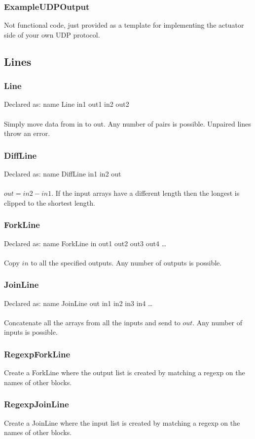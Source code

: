 \documentclass[a4paper]{article}
\begin{document}
\subsubsection{ExampleUDPOutput}
Not functional code, just provided as a template for implementing the actuator side of your own UDP protocol.
\subsection{Lines}
\subsubsection{Line}
Declared as: name Line in1 out1 in2 out2\\\\
Simply move data from in to out. Any number of pairs is possible. Unpaired lines throw an error.
\subsubsection{DiffLine}
Declared as: name DiffLine in1 in2 out\\\\
$out = in2 - in1$. If the input arrays have a different length then the longest is clipped to the shortest length.
\subsubsection{ForkLine}
Declared as: name ForkLine in out1 out2 out3 out4 \ldots\\\\
Copy $in$ to all the specified outputs. Any number of outputs is possible.
\subsubsection{JoinLine}
Declared as: name JoinLine out in1 in2 in3 in4 \ldots\\\\
Concatenate all the arrays from all the inputs and send to $out$. Any number of inputs is possible.
\subsubsection{RegexpForkLine}
Create a ForkLine where the output list is created by matching a regexp on the names of other blocks.
\subsubsection{RegexpJoinLine}
Create a JoinLine where the input list is created by matching a regexp on the names of other blocks.
\end{document}
